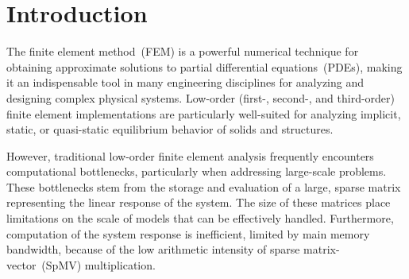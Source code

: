 \documentclass[]             %
{NASA}                       %
\begin{document}

\section{Introduction}%
\label{sec:Introduction}
The finite element method~(FEM) is a powerful numerical technique for obtaining approximate solutions to partial differential equations~(PDEs), making it an indispensable tool in many engineering disciplines for analyzing and designing complex physical systems.  
Low-order (first-, second-, and third-order) finite element implementations are particularly well-suited for analyzing implicit, static, or quasi-static equilibrium behavior of solids and structures.

However, traditional low-order finite element analysis frequently encounters computational bottlenecks, particularly when addressing large-scale problems. 
These bottlenecks stem from the storage and evaluation of a large, sparse matrix representing the linear response of the system. 
The size of these matrices place limitations on the scale of models that can be effectively handled. 
Furthermore, computation of the system response is inefficient, limited by main memory bandwidth, because of the low arithmetic intensity of sparse matrix-vector~(SpMV) multiplication. 
\end{document}
